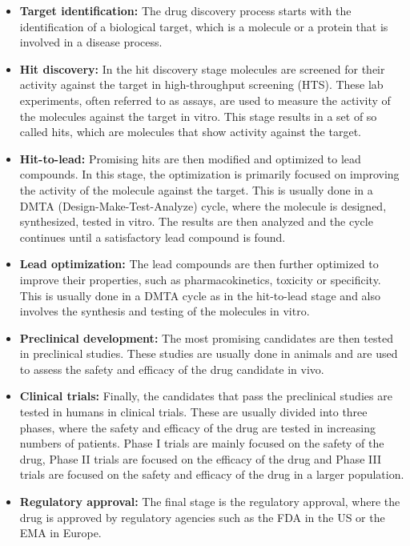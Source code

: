 \begin{itemize}
      \item \textbf{Target identification:} The drug discovery process starts with the
            identification of a biological target, which is a molecule or a protein that is involved
            in a disease process.
      \item \textbf{Hit discovery:} In the hit discovery stage molecules are screened for their
            activity against the target in high-throughput screening (HTS). These lab experiments,
            often referred to as assays, are used to measure the activity of the molecules against
            the target in vitro. This stage results in a set of so called hits, which are molecules
            that show activity against the target.
      \item \textbf{Hit-to-lead:} Promising hits are then modified and optimized to lead compounds.
            In this stage, the optimization is primarily focused on improving the activity of the
            molecule against the target. This is usually done in a DMTA (Design-Make-Test-Analyze)
            cycle, where the molecule is designed, synthesized, tested in vitro. The results are
            then analyzed and the cycle continues until a satisfactory lead compound is found.
      \item \textbf{Lead optimization:} The lead compounds are then further optimized to improve
            their properties, such as pharmacokinetics, toxicity or specificity. This is usually
            done in a DMTA cycle as in the hit-to-lead stage and also involves the synthesis and
            testing of the molecules in vitro.
      \item \textbf{Preclinical development:} The most promising candidates are then tested in
            preclinical studies. These studies are usually done in animals and are used to assess
            the safety and efficacy of the drug candidate in vivo.
      \item \textbf{Clinical trials:} Finally, the candidates that pass the preclinical studies are
            tested in humans in clinical trials. These are usually divided into three phases, where
            the safety and efficacy of the drug are tested in increasing numbers of patients. Phase
            I trials are mainly focused on the safety of the drug, Phase II trials are focused on
            the efficacy of the drug and Phase III trials are focused on the safety and efficacy of
            the drug in a larger population.
      \item \textbf{Regulatory approval:} The final stage is the regulatory approval, where the drug
            is approved by regulatory agencies such as the FDA in the US or the EMA in Europe.
\end{itemize}

